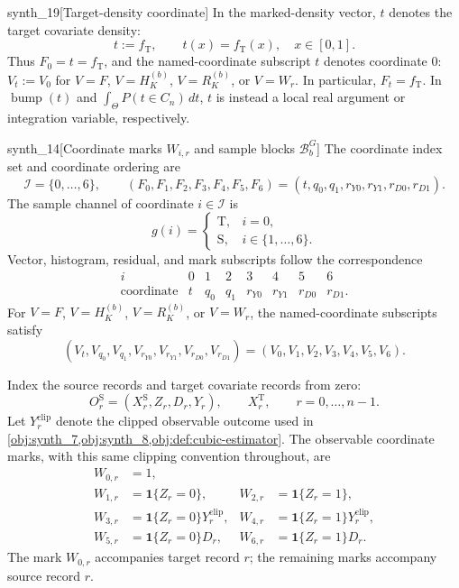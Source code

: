 \documentclass[11pt]{article}
\begin{document}
\begin{definitionv}{synth_19}[Target-density coordinate]
In the marked-density vector, \(t\) denotes the target covariate density:
\[
t:=f_{\mathrm T},\qquad t(x)=f_{\mathrm T}(x),\quad x\in[0,1].
\]
Thus \(F_0=t=f_{\mathrm T}\), and the named-coordinate subscript \(t\) denotes coordinate \(0\): \(V_t:=V_0\) for \(V=F\), \(V=H_K^{(b)}\), \(V=R_K^{(b)}\), or \(V=W_r\). In particular, \(F_t=f_{\mathrm T}\). In \(\operatorname{bump}(t)\) and \(\int_{\Theta}P(t\in C_n)\,dt\), \(t\) is instead a local real argument or integration variable, respectively.
\end{definitionv}

\begin{definitionv}{synth_14}[Coordinate marks \(W_{i,r}\) and sample blocks \(\mathcal B_b^G\)]
The coordinate index set and coordinate ordering are
\[
\mathcal I=\{0,\ldots,6\},
\qquad
(F_0,F_1,F_2,F_3,F_4,F_5,F_6)
=(t,q_0,q_1,r_{Y0},r_{Y1},r_{D0},r_{D1}).
\]
The sample channel of coordinate \(i\in\mathcal I\) is
\[
g(i)=
\begin{cases}
\mathrm T,&i=0,\\
\mathrm S,&i\in\{1,\ldots,6\}.
\end{cases}
\]
Vector, histogram, residual, and mark subscripts follow the correspondence
\[
\begin{array}{c|ccccccc}
i&0&1&2&3&4&5&6\\ \hline
\text{coordinate}&t&q_0&q_1&r_{Y0}&r_{Y1}&r_{D0}&r_{D1}.
\end{array}
\]
For \(V=F\), \(V=H_K^{(b)}\), \(V=R_K^{(b)}\), or \(V=W_r\), the named-coordinate subscripts satisfy
\[
(V_t,V_{q_0},V_{q_1},V_{r_{Y0}},V_{r_{Y1}},V_{r_{D0}},V_{r_{D1}})
=(V_0,V_1,V_2,V_3,V_4,V_5,V_6).
\]

Index the source records and target covariate records from zero:
\[
O_r^{\mathrm S}=(X_r^{\mathrm S},Z_r,D_r,Y_r),
\qquad
X_r^{\mathrm T},
\qquad r=0,\ldots,n-1.
\]
Let \(Y_r^{\mathrm{clip}}\) denote the clipped observable outcome used in
\cref{obj:synth_7,obj:synth_8,obj:def:cubic-estimator}.
The observable coordinate marks, with this same clipping convention throughout, are
\[
\begin{aligned}
W_{0,r}&=1,\\
W_{1,r}&=\mathbf 1\{Z_r=0\},
&
W_{2,r}&=\mathbf 1\{Z_r=1\},\\
W_{3,r}&=\mathbf 1\{Z_r=0\}Y_r^{\mathrm{clip}},
&
W_{4,r}&=\mathbf 1\{Z_r=1\}Y_r^{\mathrm{clip}},\\
W_{5,r}&=\mathbf 1\{Z_r=0\}D_r,
&
W_{6,r}&=\mathbf 1\{Z_r=1\}D_r.
\end{aligned}
\]
The mark \(W_{0,r}\) accompanies target record \(r\); the remaining marks accompany source record \(r\).


\end{definitionv}
\end{document}
